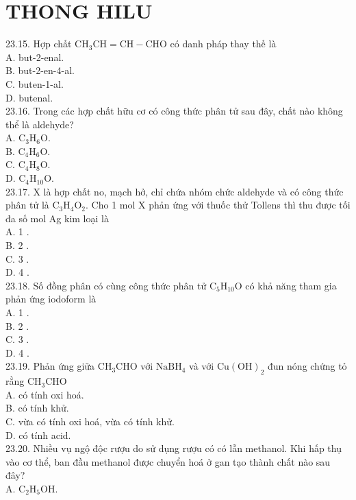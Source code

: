 \documentclass[10pt]{article}
\begin{document}
\section*{THONG HILU}
23.15. Hợp chất $\mathrm{CH}_{3} \mathrm{CH}=\mathrm{CH}-\mathrm{CHO}$ có danh pháp thay thế là\\
A. but-2-enal.\\
B. but-2-en-4-al.\\
C. buten-1-al.\\
D. butenal.\\
23.16. Trong các hợp chất hữu cơ có công thức phân tử sau đây, chất nào không thể là aldehyde?\\
A. $\mathrm{C}_{3} \mathrm{H}_{6} \mathrm{O}$.\\
B. $\mathrm{C}_{4} \mathrm{H}_{6} \mathrm{O}$.\\
C. $\mathrm{C}_{4} \mathrm{H}_{8} \mathrm{O}$.\\
D. $\mathrm{C}_{4} \mathrm{H}_{10} \mathrm{O}$.\\
23.17. X là hợp chất no, mạch hở, chỉ chứa nhóm chức aldehyde và có công thức phân tử là $\mathrm{C}_{3} \mathrm{H}_{4} \mathrm{O}_{2}$. Cho 1 mol X phản ứng với thuốc thử Tollens thì thu được tối đa số mol Ag kim loại là\\
A. 1 .\\
B. 2 .\\
C. 3 .\\
D. 4 .\\
23.18. Số đồng phân có cùng công thức phân tử $\mathrm{C}_{5} \mathrm{H}_{10} \mathrm{O}$ có khả năng tham gia phản ứng iodoform là\\
A. 1 .\\
B. 2 .\\
C. 3 .\\
D. 4 .\\
23.19. Phản ứng giữa $\mathrm{CH}_{3} \mathrm{CHO}$ với $\mathrm{NaBH}_{4}$ và với $\mathrm{Cu}(\mathrm{OH})_{2}$ đun nóng chứng tỏ rằng $\mathrm{CH}_{3} \mathrm{CHO}$\\
A. có tính oxi hoá.\\
B. có tính khử.\\
C. vừa có tính oxi hoá, vừa có tính khử.\\
D. có tính acid.\\
23.20. Nhiều vụ ngộ độc rượu do sử dụng rượu có có lẫn methanol. Khi hấp thụ vào cơ thể, ban đầu methanol được chuyển hoá ở gan tạo thành chất nào sau đây?\\
A. $\mathrm{C}_{2} \mathrm{H}_{5} \mathrm{OH}$.\\
\end{document}
